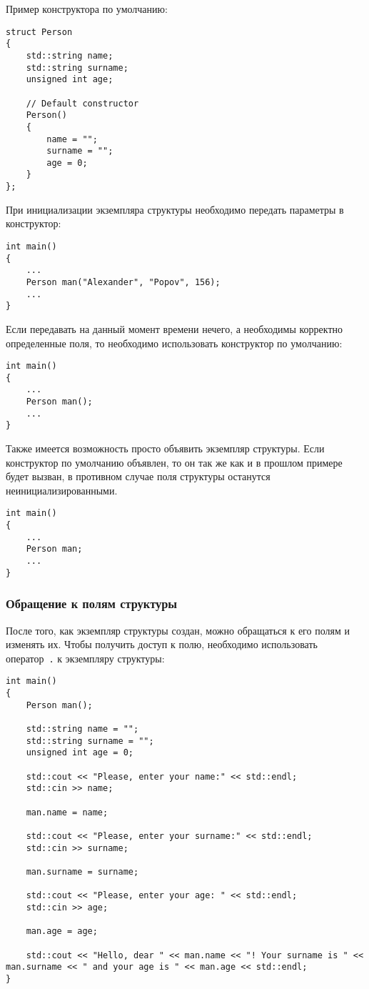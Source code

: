 Пример конструктора по умолчанию:
\begin{lstlisting}
struct Person
{
    std::string name;
    std::string surname;
    unsigned int age;

    // Default constructor
    Person()
    {
        name = "";
        surname = "";
        age = 0;
    }
};
\end{lstlisting}


При инициализации экземпляра структуры необходимо передать параметры в конструктор:
\begin{lstlisting}
int main()
{
    ...
    Person man("Alexander", "Popov", 156);
    ...
}
\end{lstlisting}

Если передавать на данный момент времени нечего, а необходимы корректно определенные поля, то необходимо использовать конструктор по умолчанию:
\begin{lstlisting}
int main()
{
    ...
    Person man();
    ...
}
\end{lstlisting}

Также имеется возможность просто объявить экземпляр структуры.
Если конструктор по умолчанию объявлен, то он так же как и в прошлом примере будет вызван,
в противном случае поля структуры останутся неинициализированными.

\begin{lstlisting}
int main()
{
    ...
    Person man;
    ...
}
\end{lstlisting}

\subsubsection{Обращение к полям структуры}

После того, как экземпляр структуры создан, можно обращаться к его полям и изменять их. Чтобы получить доступ к полю, необходимо использовать оператор~\lstinline|.| к экземпляру структуры:

\begin{lstlisting}
int main()
{
    Person man();

    std::string name = "";
    std::string surname = "";
    unsigned int age = 0;

    std::cout << "Please, enter your name:" << std::endl;
    std::cin >> name;

    man.name = name;

    std::cout << "Please, enter your surname:" << std::endl;
    std::cin >> surname;

    man.surname = surname;

    std::cout << "Please, enter your age: " << std::endl;
    std::cin >> age;

    man.age = age;

    std::cout << "Hello, dear " << man.name << "! Your surname is " << man.surname << " and your age is " << man.age << std::endl;
}
\end{lstlisting} 
